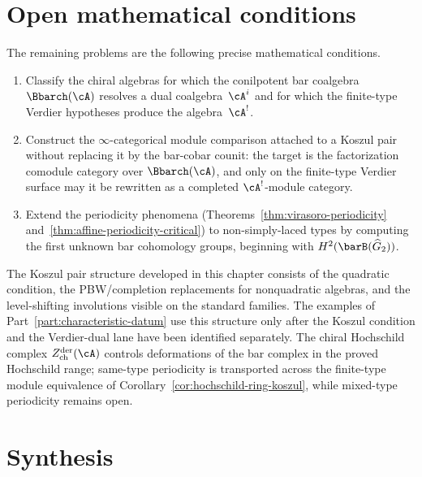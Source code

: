 \section{Open mathematical conditions}

The remaining problems are the following precise mathematical conditions.
\begin{enumerate}
\item Classify the chiral algebras for which the conilpotent bar
coalgebra $\Bbarch(\cA)$ resolves a dual coalgebra~$\cA^i$ and for
which the finite-type Verdier hypotheses produce
the algebra~$\cA^!$.
\item Construct the $\infty$-categorical module comparison attached
to a Koszul pair without replacing it by the bar-cobar counit:
the target is the factorization comodule category over
$\Bbarch(\cA)$, and only on the finite-type Verdier surface may it be
rewritten as a completed $\cA^!$-module category.
\item Extend the periodicity phenomena
(Theorems~\ref{thm:virasoro-periodicity}
and~\ref{thm:affine-periodicity-critical}) to non-simply-laced types
by computing the first unknown bar cohomology groups, beginning with
$H^2(\barB(\widehat{G}_2))$.
\end{enumerate}

\medskip

The Koszul pair structure developed in this chapter consists of the
quadratic condition, the PBW/completion replacements for
nonquadratic algebras, and the level-shifting involutions visible on
the standard families.  The examples of
Part~\ref{part:characteristic-datum} use this structure only after
the Koszul condition and the Verdier-dual lane have been identified
separately.  The chiral Hochschild complex
$Z^{\mathrm{der}}_{\mathrm{ch}}(\cA)$ controls deformations of the
bar complex in the proved Hochschild range; same-type periodicity is
transported across the finite-type module equivalence of
Corollary~\ref{cor:hochschild-ring-koszul}, while mixed-type
periodicity remains open.

\section{Synthesis}
\label{sec:kps-supplement}

